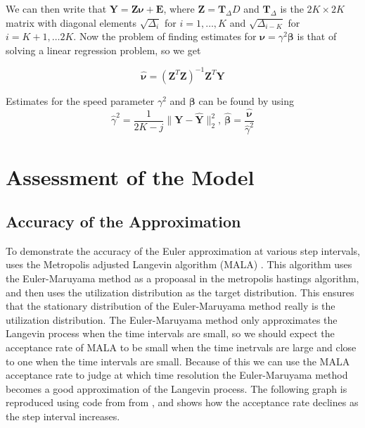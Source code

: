 We can then write  that $\mathbf{Y} = \mathbf{Z} \bm{\nu} + \mathbf{E}$, where $\mathbf{Z} = \mathbf{T}_\Delta D$ and $\mathbf{T}_\Delta$ is the $2K\times 2K$ matrix with diagonal elements $\sqrt{\Delta_i}$ for $i=1, \dots, K$ and $\sqrt{\Delta_{i-K}}$ for $i=K+1,\dots 2K$. Now the problem of finding estimates for $\bm{\nu} = \gamma^2 \bm{\beta}$ is that of solving a linear regression problem, so we get

$$
\bm{\hat{\nu}} = (\mathbf{Z}^T\mathbf{Z})^{-1}\mathbf{Z}^T \mathbf{Y}
$$

Estimates for the speed parameter $\gamma^2$ and $\bm{\beta}$ can be found by using
$$
\hat{\gamma}^2 = \frac{1}{2K-j} \lVert \mathbf{Y} - \mathbf{\hat{Y}} \rVert^2_2, \ 
\bm{\hat{\beta}} = \frac{\bm{\hat{\nu}}}{\hat{\gamma}^2}
\label{eq: michelot estimates}
$$



\section{Assessment of the Model}

\subsection{Accuracy of the Approximation}
To demonstrate the accuracy of the Euler approximation at various step intervals, \parencite{michelot_langevin_2019} uses the Metropolis adjusted Langevin algorithm (MALA) \parencite{roberts_exponential_1996}. This algorithm uses the Euler-Maruyama method as a propoasal in the metropolis hastings algorithm, and then uses the utilization distribution as the target distribution. This ensures that the stationary distribution of the Euler-Maruyama method really is the utilization distribution. The Euler-Maruyama method only approximates the Langevin process when the time intervals are small, so we should expect the acceptance rate of MALA to be small when the time inetrvals are large and close to one when the time intervals are small. Because of this we can use the MALA acceptance rate to judge at which time resolution the Euler-Maruyama method becomes a good approximation of the Langevin process. The following graph is reproduced using code from from \parencite{michelot_langevin_2019}, and shows how the acceptance rate declines as the step interval increases.

